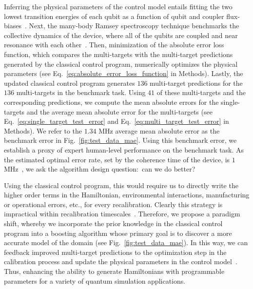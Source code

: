 \documentclass[aps,twocolumn,superscriptaddress,floatfix,preprintnumbers,showkeys]{revtex4}
\begin{document}
Inferring the physical parameters of the control model entails fitting the two lowest transition energies of each qubit as a function of qubit and coupler flux-biases~\cite{Neill_2018}. Next, the many-body Ramsey spectroscopy technique benchmarks the collective dynamics of the device, where all of the qubits are coupled and near resonance with each other~\cite{Roushan_2017, Chiaro_2019}. Then, minimization of the absolute error loss function, which compares the multi-targets with the multi-target predictions generated by the classical control program, numerically optimizes the physical parameters (see Eq.~\ref{eq:absolute_error_loss_function} in Methods). Lastly, the updated classical control program generates $136$ multi-target predictions for the $136$ multi-targets in the benchmark task. Using $41$ of these multi-targets and the corresponding predictions, we compute the mean absolute errors for the single-targets and the average mean absolute error for the multi-targets (see Eq.~\ref{eq:single_target_test_error} and Eq.~\ref{eq:multi_target_test_error} in Methods). We refer to the $1.34$ MHz average mean absolute error as the benchmark error in Fig.~\ref{fig:test_data_mae}. Using this benchmark error, we establish a proxy of expert human-level performance on the benchmark task. As the estimated optimal error rate, set by the coherence time of the device, is $1$MHz~\cite{Roushan_2017}, we ask the algorithm design question:\ can we do better? 

Using the classical control program, this would require us to directly write the higher order terms in the Hamiltonian, environmental interactions, manufacturing or operational errors, etc., for every recalibration. Clearly this strategy is impractical within recalibration timescales~\cite{Linke_2017, Kelly_2018_1}. Therefore, we propose a paradigm shift, whereby we incorporate the prior knowledge in the classical control program into a boosting algorithm whose primary goal is to discover a more accurate model of the domain (see Fig.~\ref{fig:test_data_mae}). In this way, we can feedback improved multi-target predictions to the optimization step in the calibration process and update the physical parameters in the control model~\cite{Neill_2018}. Thus, enhancing the ability to generate Hamiltonians with programmable parameters for a variety of quantum simulation applications.
\end{document}

